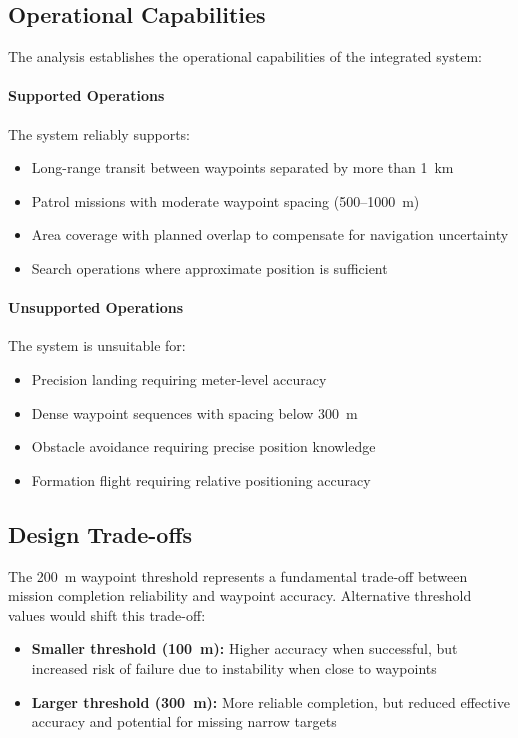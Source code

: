\documentclass[master,final,11pt]{iscs-thesis}
\begin{document}
\subsection{Operational Capabilities}

The analysis establishes the operational capabilities of the integrated system:

\paragraph{Supported Operations}
The system reliably supports:
\begin{itemize}
    \item Long-range transit between waypoints separated by more than 1~km
    \item Patrol missions with moderate waypoint spacing (500--1000~m)
    \item Area coverage with planned overlap to compensate for navigation uncertainty
    \item Search operations where approximate position is sufficient
\end{itemize}

\paragraph{Unsupported Operations}
The system is unsuitable for:
\begin{itemize}
    \item Precision landing requiring meter-level accuracy
    \item Dense waypoint sequences with spacing below 300~m
    \item Obstacle avoidance requiring precise position knowledge
    \item Formation flight requiring relative positioning accuracy
\end{itemize}

\subsection{Design Trade-offs}

The 200~m waypoint threshold represents a fundamental trade-off between mission completion reliability and waypoint accuracy.
Alternative threshold values would shift this trade-off:
\begin{itemize}
    \item \textbf{Smaller threshold (100~m):} Higher accuracy when successful, but increased risk of failure due to instability when close to waypoints
    \item \textbf{Larger threshold (300~m):} More reliable completion, but reduced effective accuracy and potential for missing narrow targets
\end{itemize}
\end{document}

